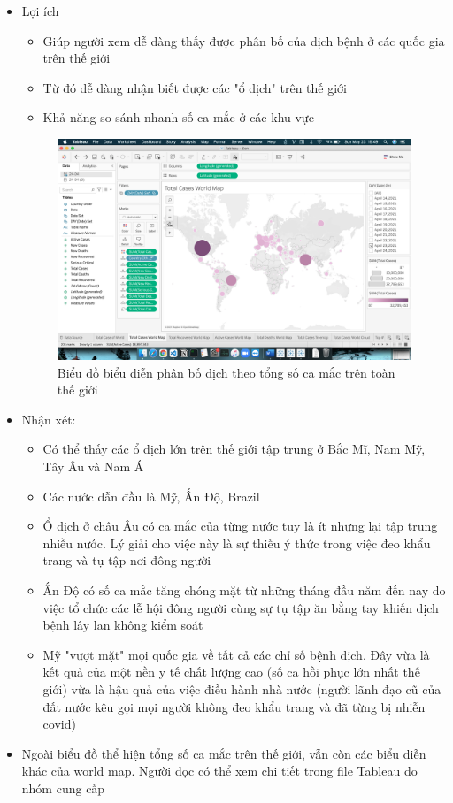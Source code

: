 \documentclass[a4paper, 12pt]{article}
\begin{document}
\begin{itemize}
    \item Lợi ích
    \begin{itemize}
        \item Giúp người xem dễ dàng thấy được phân bố của dịch bệnh ở các quốc gia trên thế giới
        \item Từ đó dễ dàng nhận biết được các "ổ dịch" trên thế giới
        \item Khả năng so sánh nhanh số ca mắc ở các khu vực
    \end{itemize}

    \begin{figure}[H]
        \begin{center}
            \includegraphics[scale=0.4]{img/worldMap.png}
            \caption{Biểu đồ biểu diễn phân bố dịch theo tổng số ca mắc trên toàn thế giới}
        \end{center}
    \end{figure}

    \item Nhận xét:
    \begin{itemize}
        \item Có thể thấy các ổ dịch lớn trên thế giới tập trung ở Bắc Mĩ, Nam Mỹ, Tây Âu và Nam Á
        \item Các nước dẫn đầu là Mỹ, Ấn Độ, Brazil
        \item Ổ dịch ở châu Âu có ca mắc của từng nước tuy là ít nhưng lại tập trung nhiều nước. Lý giải cho việc này là sự thiếu ý thức trong việc đeo khẩu trang và tụ tập nơi đông người
        \item Ấn Độ có số ca mắc tăng chóng mặt từ những tháng đầu năm đến nay do việc tổ chức các lễ hội đông người cùng sự tụ tập ăn bằng tay khiến dịch bệnh lây lan không kiểm soát
        \item Mỹ "vượt mặt" mọi quốc gia về tất cả các chỉ số bệnh dịch. Đây vừa là kết quả của một nền y tế chất lượng cao (số ca hồi phục lớn nhất thế giới) vừa là hậu quả của việc điều hành nhà nước (người lãnh đạo cũ của đất nước kêu gọi mọi người không đeo khẩu trang và đã từng bị nhiễn covid)
    \end{itemize}

    \item Ngoài biểu đồ thể hiện tổng số ca mắc trên thế giới, vẫn còn các biểu diễn khác của world map. Người đọc có thể xem chi tiết trong file Tableau do nhóm cung cấp
\end{itemize}
\end{document}
